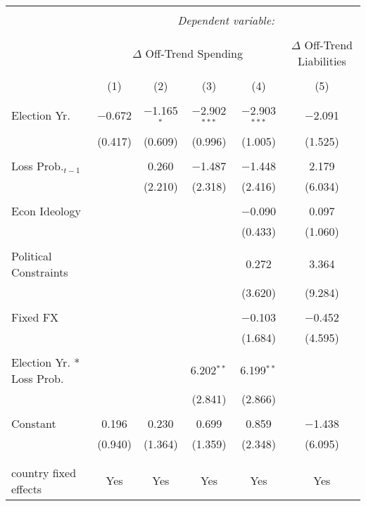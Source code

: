 
\begingroup 
\tiny 
\begin{tabular}{@{\extracolsep{5pt}}lccccc} 
\\[-1.8ex]\hline 
\hline \\[-1.8ex] 
 & \multicolumn{5}{c}{\textit{Dependent variable:}} \\ 
\cline{2-6} 
\\[-1.8ex] & \multicolumn{4}{c}{$\Delta$ Off-Trend Spending} & $\Delta$ Off-Trend Liabilities \\ 
\\[-1.8ex] & (1) & (2) & (3) & (4) & (5)\\ 
\hline \\[-1.8ex] 
 Election Yr. & $-$0.672 & $-$1.165$^{*}$ & $-$2.902$^{***}$ & $-$2.903$^{***}$ & $-$2.091 \\ 
  & (0.417) & (0.609) & (0.996) & (1.005) & (1.525) \\ 
  & & & & & \\ 
 Loss Prob.$_{t-1}$ &  & 0.260 & $-$1.487 & $-$1.448 & 2.179 \\ 
  &  & (2.210) & (2.318) & (2.416) & (6.034) \\ 
  & & & & & \\ 
 Econ Ideology &  &  &  & $-$0.090 & 0.097 \\ 
  &  &  &  & (0.433) & (1.060) \\ 
  & & & & & \\ 
 Political Constraints &  &  &  & 0.272 & 3.364 \\ 
  &  &  &  & (3.620) & (9.284) \\ 
  & & & & & \\ 
 Fixed FX &  &  &  & $-$0.103 & $-$0.452 \\ 
  &  &  &  & (1.684) & (4.595) \\ 
  & & & & & \\ 
 Election Yr. * Loss Prob. &  &  & 6.202$^{**}$ & 6.199$^{**}$ &  \\ 
  &  &  & (2.841) & (2.866) &  \\ 
  & & & & & \\ 
 Constant & 0.196 & 0.230 & 0.699 & 0.859 & $-$1.438 \\ 
  & (0.940) & (1.364) & (1.359) & (2.348) & (6.095) \\ 
  & & & & & \\ 
\hline \\[-1.8ex] 
country fixed effects & Yes & Yes & Yes & Yes & Yes \\ 

\end{tabular}
